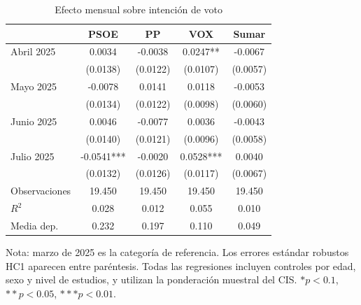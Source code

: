 \begin{table}[H]
\centering
\caption{Efecto mensual sobre intención de voto}
\label{tab:voto-completa}
\small
\begin{tabular}{lcccc}
\hline
 & PSOE & PP & VOX & Sumar \\
\hline
Abril 2025 & 0.0034 & -0.0038 & 0.0247** & -0.0067 \\
 & (0.0138) & (0.0122) & (0.0107) & (0.0057) \\
Mayo 2025 & -0.0078 & 0.0141 & 0.0118 & -0.0053 \\
 & (0.0134) & (0.0122) & (0.0098) & (0.0060) \\
Junio 2025 & 0.0046 & -0.0077 & 0.0036 & -0.0043 \\
 & (0.0140) & (0.0121) & (0.0096) & (0.0058) \\
Julio 2025 & -0.0541*** & -0.0020 & 0.0528*** & 0.0040 \\
 & (0.0132) & (0.0126) & (0.0117) & (0.0067) \\
Observaciones & 19.450 & 19.450 & 19.450 & 19.450 \\
$R^2$ & 0.028 & 0.012 & 0.055 & 0.010 \\
Media dep. & 0.232 & 0.197 & 0.110 & 0.049 \\
\hline
\end{tabular}
\begin{flushleft}
\footnotesize Nota: marzo de 2025 es la categoría de referencia. Los errores estándar robustos HC1 aparecen entre paréntesis. Todas las regresiones incluyen controles por edad, sexo y nivel de estudios, y utilizan la ponderación muestral del CIS. $* p<0.1$, $** p<0.05$, $*** p<0.01$.
\end{flushleft}
\end{table}
